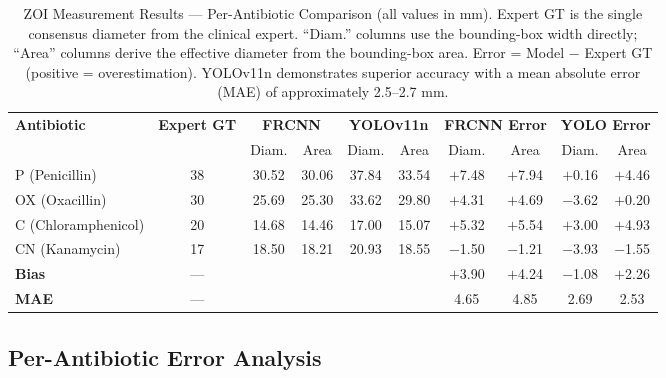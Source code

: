 \begin{table}[H]
  \centering
  \caption{ZOI Measurement Results --- Per-Antibiotic Comparison (all values in mm).
           Expert GT is the single consensus diameter from the clinical expert.
           ``Diam.'' columns use the bounding-box width directly;
           ``Area'' columns derive the effective diameter from the bounding-box area.
           Error = Model $-$ Expert GT (positive = overestimation).
           YOLOv11n demonstrates superior accuracy with a mean absolute error (MAE) of approximately 2.5--2.7 mm.}
  \label{tab:model_comparison}
  \renewcommand{\arraystretch}{1.15}
  \begin{tabular}{lccccccccc}
    \toprule
    \multirow{2}{*}{\textbf{Antibiotic}} &
    \multirow{2}{*}{\textbf{Expert GT}} &
    \multicolumn{2}{c}{\textbf{FRCNN}} &
    \multicolumn{2}{c}{\textbf{YOLOv11n}} &
    \multicolumn{2}{c}{\textbf{FRCNN Error}} &
    \multicolumn{2}{c}{\textbf{YOLO Error}} \\
    \cmidrule(lr){3-4}\cmidrule(lr){5-6}\cmidrule(lr){7-8}\cmidrule(lr){9-10}
    & & Diam. & Area & Diam. & Area & Diam. & Area & Diam. & Area \\
    \midrule
    P  (Penicillin)       & 38 & 30.52 & 30.06 & 37.84 & 33.54 & $+$7.48 & $+$7.94 & $+$0.16 & $+$4.46 \\
    OX (Oxacillin)        & 30 & 25.69 & 25.30 & 33.62 & 29.80 & $+$4.31 & $+$4.69 & $-$3.62 & $+$0.20 \\
    C  (Chloramphenicol)  & 20 & 14.68 & 14.46 & 17.00 & 15.07 & $+$5.32 & $+$5.54 & $+$3.00 & $+$4.93 \\
    CN (Kanamycin)        & 17 & 18.50 & 18.21 & 20.93 & 18.55 & $-$1.50 & $-$1.21 & $-$3.93 & $-$1.55 \\
    \midrule
    \textbf{Bias}         & --- & \multicolumn{2}{c}{} & \multicolumn{2}{c}{} &
                            $+$3.90 & $+$4.24 &
                            $-$1.08 & $+$2.26 \\
    \textbf{MAE}          & --- & \multicolumn{2}{c}{} & \multicolumn{2}{c}{} &
                            4.65 & 4.85 &
                            2.69 & 2.53 \\
    \bottomrule
  \end{tabular}
\end{table}

\subsection{Per-Antibiotic Error Analysis}

